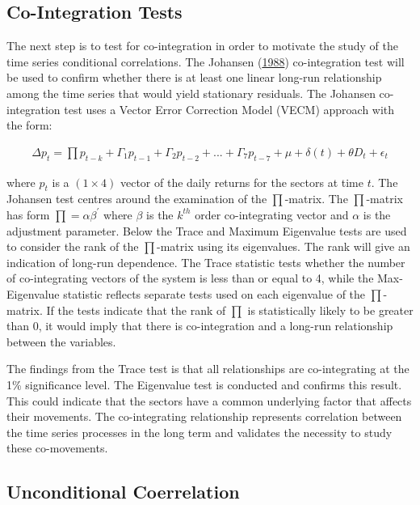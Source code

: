 \documentclass[11pt,preprint, authoryear]{elsarticle}
\numberwithin{equation}{section}
\numberwithin{figure}{section}
\numberwithin{table}{section}
\begin{document}
\hypertarget{co-integration-tests}{%
\subsection{Co-Integration Tests}\label{co-integration-tests}}

The next step is to test for co-integration in order to motivate the
study of the time series conditional correlations. The Johansen
(\protect\hyperlink{ref-johansen1988}{1988}) co-integration test will be
used to confirm whether there is at least one linear long-run
relationship among the time series that would yield stationary
residuals. The Johansen co-integration test uses a Vector Error
Correction Model (VECM) approach with the form:

\begin{align}
  \Delta p_t = \prod p_{t-k} + \Gamma_1 p_{t-1} + \Gamma_2 p_{t-2} + ... + \Gamma_{7} p_{t-7} + \mu + \delta (t) + \theta D_t + \epsilon_t \label{eq1}
\end{align}

where \(p_t\) is a \((1 \times 4)\) vector of the daily returns for the
sectors at time \(t\). The Johansen test centres around the examination
of the \(\prod\)-matrix. The \(\prod\)-matrix has form
\(\prod = \alpha \beta^{'}\) where \(\beta\) is the \(k^{th}\) order
co-integrating vector and \(\alpha\) is the adjustment parameter. Below
the Trace and Maximum Eigenvalue tests are used to consider the rank of
the \(\prod\)-matrix using its eigenvalues. The rank will give an
indication of long-run dependence. The Trace statistic tests whether the
number of co-integrating vectors of the system is less than or equal to
4, while the Max-Eigenvalue statistic reflects separate tests used on
each eigenvalue of the \(\prod\)-matrix. If the tests indicate that the
rank of \(\prod\) is statistically likely to be greater than 0, it would
imply that there is co-integration and a long-run relationship between
the variables.

The findings from the Trace test is that all relationships are
co-integrating at the 1\% significance level. The Eigenvalue test is
conducted and confirms this result. This could indicate that the sectors
have a common underlying factor that affects their movements. The
co-integrating relationship represents correlation between the time
series processes in the long term and validates the necessity to study
these co-movements.

\hypertarget{unconditional-coerrelation}{%
\subsection{Unconditional
Coerrelation}\label{unconditional-coerrelation}}
\end{document}
